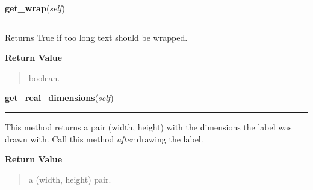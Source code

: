     \label{pygtk_chart:label:Label:get_wrap}

    \vspace{0.5ex}

\hspace{.8\funcindent}\begin{boxedminipage}{\funcwidth}

    \raggedright \textbf{get\_wrap}(\textit{self})

    \vspace{-1.5ex}

    \rule{\textwidth}{0.5\fboxrule}
\setlength{\parskip}{2ex}
    Returns True if too long text should be wrapped.

\setlength{\parskip}{1ex}
      \textbf{Return Value}
    \vspace{-1ex}

      \begin{quote}
      boolean.

      \end{quote}

    \end{boxedminipage}

    \label{pygtk_chart:label:Label:get_real_dimensions}

    \vspace{0.5ex}

\hspace{.8\funcindent}\begin{boxedminipage}{\funcwidth}

    \raggedright \textbf{get\_real\_dimensions}(\textit{self})

    \vspace{-1.5ex}

    \rule{\textwidth}{0.5\fboxrule}
\setlength{\parskip}{2ex}
    This method returns a pair (width, height) with the dimensions the 
    label was drawn with. Call this method \textit{after} drawing the 
    label.

\setlength{\parskip}{1ex}
      \textbf{Return Value}
    \vspace{-1ex}

      \begin{quote}
      a (width, height) pair.

      \end{quote}

    \end{boxedminipage}

